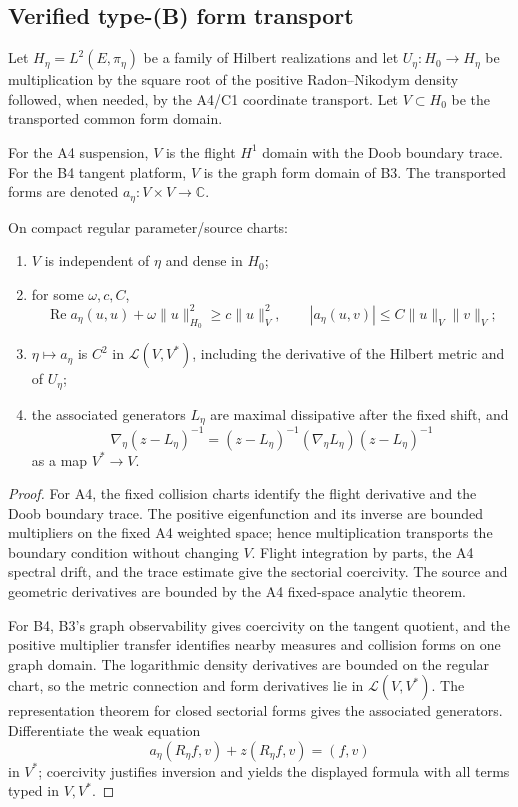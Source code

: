 \subsection{Verified type-(B) form transport}

Let $H_\eta=L^2(E,\pi_\eta)$ be a family of Hilbert realizations and let
$U_\eta:H_0\to H_\eta$ be multiplication by the square root of the positive
Radon--Nikodym density followed, when needed, by the A4/C1 coordinate
transport.  Let $V\subset H_0$ be the transported common form domain.

For the A4 suspension, $V$ is the flight $H^1$ domain with the Doob boundary
trace.  For the B4 tangent platform, $V$ is the graph form domain of B3.  The
transported forms are denoted $a_\eta:V\times V\to\mathbb C$.

\begin{theorem}
\label{thm:r21-c2-typeb}
On compact regular parameter/source charts:
\begin{enumerate}[label=(\roman*)]
\item $V$ is independent of $\eta$ and dense in $H_0$;
\item for some $\omega,c,C$,
\[
 \operatorname{Re}a_\eta(u,u)+\omega\|u\|_{H_0}^2
 \ge c\|u\|_V^2,
 \qquad |a_\eta(u,v)|\le C\|u\|_V\|v\|_V;
\]
\item $\eta\mapsto a_\eta$ is $C^2$ in
$\mathcal L(V,V^*)$, including the derivative of the Hilbert metric and of
$U_\eta$;
\item the associated generators $L_\eta$ are maximal dissipative after the
fixed shift, and
\[
 \nabla_\eta(z-L_\eta)^{-1}
 =(z-L_\eta)^{-1}(\nabla_\eta L_\eta)
  (z-L_\eta)^{-1}
\]
as a map $V^*\to V$.
\end{enumerate}
\end{theorem}

\begin{proof}
For A4, the fixed collision charts identify the flight derivative and the
Doob boundary trace.  The positive eigenfunction and its inverse are bounded
multipliers on the fixed A4 weighted space; hence multiplication transports
the boundary condition without changing $V$.  Flight integration by parts,
the A4 spectral drift, and the trace estimate give the sectorial coercivity.
The source and geometric derivatives are bounded by the A4 fixed-space
analytic theorem.

For B4, B3's graph observability gives coercivity on the tangent quotient, and
the positive multiplier transfer identifies nearby measures and collision
forms on one graph domain.  The logarithmic density derivatives are bounded on
the regular chart, so the metric connection and form derivatives lie in
$\mathcal L(V,V^*)$.  The representation theorem for closed sectorial forms
gives the associated generators.  Differentiate the weak equation
\[
 a_\eta(R_\eta f,v)+z(R_\eta f,v)=(f,v)
\]
in $V^*$; coercivity justifies inversion and yields the displayed formula with
all terms typed in $V,V^*$.
\end{proof}

